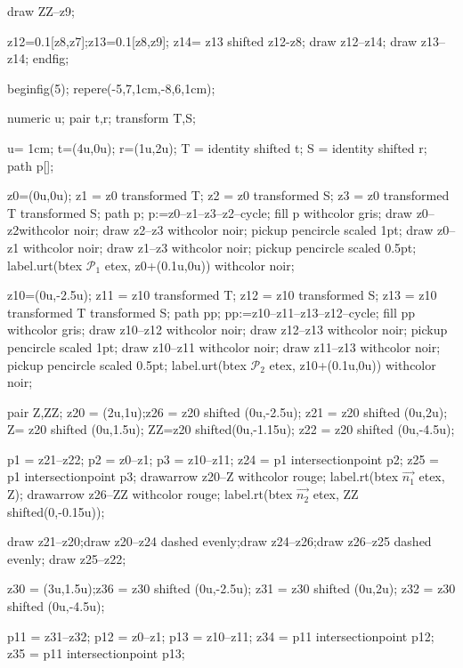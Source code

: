 \documentclass[12pt]{article}
\newcommand{\PR}{\mathscr{P}}
\begin{document}
 draw ZZ--z9;


 z12=0.1[z8,z7];z13=0.1[z8,z9];
 z14= z13 shifted z12-z8;
 draw z12--z14;
 draw z13--z14;
endfig;

beginfig(5);
 repere(-5,7,1cm,-8,6,1cm); 
 
 numeric u;
 pair t,r;
 transform T,S;

 u= 1cm;
 t=(4u,0u); r=(1u,2u);
 T = identity shifted t;
 S = identity shifted r;
 path p[];

 z0=(0u,0u);
 z1 = z0 transformed T;
 z2 = z0 transformed S;
 z3 = z0 transformed T transformed S;
 path p;
 p:=z0--z1--z3--z2--cycle;
 fill p withcolor gris;
 draw z0--z2withcolor noir;
 draw z2--z3 withcolor noir;
 pickup pencircle scaled 1pt;
 draw z0--z1 withcolor noir;
 draw z1--z3 withcolor noir;
 pickup pencircle scaled 0.5pt;
 label.urt(btex $\PR_1$ etex, z0+(0.1u,0u)) withcolor noir;

 z10=(0u,-2.5u);
 z11 = z10 transformed T;
 z12 = z10 transformed S;
 z13 = z10 transformed T transformed S;
 path pp;
 pp:=z10--z11--z13--z12--cycle;
 fill pp withcolor gris;
 draw z10--z12 withcolor noir;
 draw z12--z13 withcolor noir;
 pickup pencircle scaled 1pt;
 draw z10--z11 withcolor noir;
 draw z11--z13 withcolor noir;
 pickup pencircle scaled 0.5pt;
 label.urt(btex $\PR_2$ etex, z10+(0.1u,0u)) withcolor noir;

 pair Z,ZZ;
 z20 = (2u,1u);z26 = z20 shifted (0u,-2.5u);
 z21 = z20 shifted (0u,2u);
 Z= z20 shifted (0u,1.5u);
 ZZ=z20 shifted(0u,-1.15u);
 z22 = z20 shifted (0u,-4.5u);

 p1 = z21--z22;
 p2 = z0--z1;
 p3 = z10--z11;
 z24 = p1 intersectionpoint p2;
 z25 = p1 intersectionpoint p3;
 drawarrow z20--Z  withcolor rouge;
 label.rt(btex $\overrightarrow{n_1}$ etex, Z);
 drawarrow z26--ZZ withcolor rouge;
 label.rt(btex $\overrightarrow{n_2}$ etex, ZZ shifted(0,-0.15u));

 draw z21--z20;draw z20--z24 dashed evenly;draw z24--z26;draw z26--z25 dashed evenly; draw z25--z22;

 z30 = (3u,1.5u);z36 = z30 shifted (0u,-2.5u);
 z31 = z30 shifted (0u,2u);
 z32 = z30 shifted (0u,-4.5u);

p11 = z31--z32;
p12 = z0--z1;
p13 = z10--z11;
z34 = p11 intersectionpoint p12;
z35 = p11 intersectionpoint p13;
\end{document}
